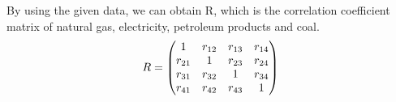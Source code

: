 \documentclass[a4paper,11pt]{article}
\begin{document}






\par By using the given data, we can obtain R, which is the correlation coefficient matrix of natural gas, electricity, petroleum products and coal.
\begin{equation}
    \centering
R=\begin{pmatrix} 1 & r_{12} & r_{13} & r_{14} \\ r_{21} & 1 & r_{23} & r_{24} \\ r_{31} & r_{32} & 1 & r_{34} \\ r_{41} & r_{42} & r_{43} & 1\end{pmatrix}
\end{equation}
\end{document}
